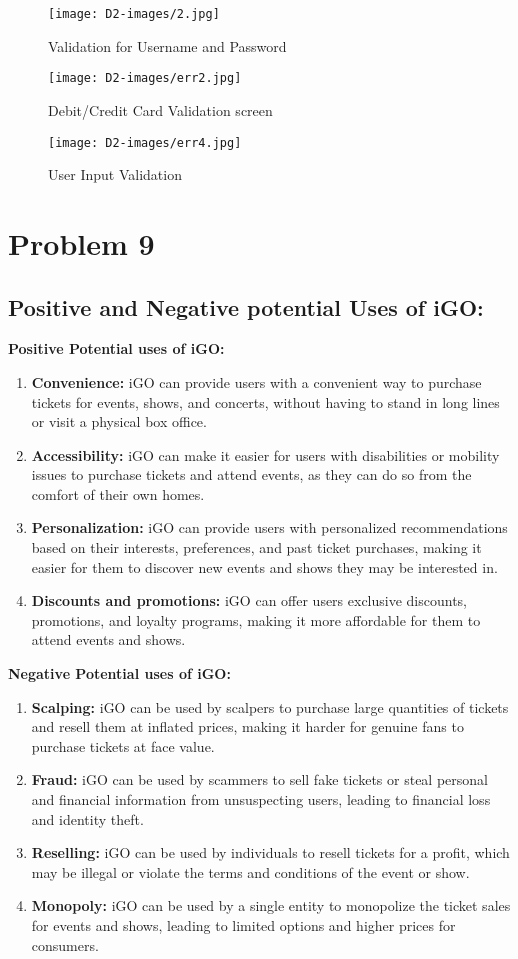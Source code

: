 \documentclass[a4paper,12pt]{report}
\newcommand{\asection}[2]{
\setcounter{section}{#1}
\addtocounter{section}{-1}
\section{#2}
}
\begin{document}
\begin{figure}[h!]
  \centering
   \texttt{[image: D2-images/2.jpg]}
  \caption{Validation for Username and Password}
\end{figure}
\begin{figure}[h!]
  \centering
   \texttt{[image: D2-images/err2.jpg]}
  \caption{Debit/Credit Card Validation screen}
\end{figure}
\begin{figure}[h!]
  \centering
   \texttt{[image: D2-images/err4.jpg]}
  \caption{User Input Validation}
\end{figure}
\chapter{Problem 9}
\asection{1}{Positive and Negative potential Uses of iGO:}
\textbf{Positive Potential uses of iGO:}
\begin{enumerate}
     \item \textbf{Convenience:} iGO can provide users with a convenient way to purchase tickets for events, shows, and concerts, without having to stand in long lines or visit a physical box office.
     \item \textbf{Accessibility: } iGO can make it easier for users with disabilities or mobility issues to purchase tickets and attend events, as they can do so from the comfort of their own homes.
     \item \textbf{Personalization: }  iGO can provide users with personalized recommendations based on their interests, preferences, and past ticket purchases, making it easier for them to discover new events and shows they may be interested in.
     \item \textbf{Discounts and promotions: } iGO can offer users exclusive discounts, promotions, and loyalty programs, making it more affordable for them to attend events and shows.
\end{enumerate}
\textbf{Negative Potential uses of iGO:}
\begin{enumerate}
     \item \textbf{Scalping: } iGO can be used by scalpers to purchase large quantities of tickets and resell them at inflated prices, making it harder for genuine fans to purchase tickets at face value.
     \item \textbf{Fraud: } iGO can be used by scammers to sell fake tickets or steal personal and financial information from unsuspecting users, leading to financial loss and identity theft.
     \item \textbf{Reselling: } iGO can be used by individuals to resell tickets for a profit, which may be illegal or violate the terms and conditions of the event or show.
     \item \textbf{Monopoly: } iGO can be used by a single entity to monopolize the ticket sales for events and shows, leading to limited options and higher prices for consumers.
\end{enumerate}
\end{document}
